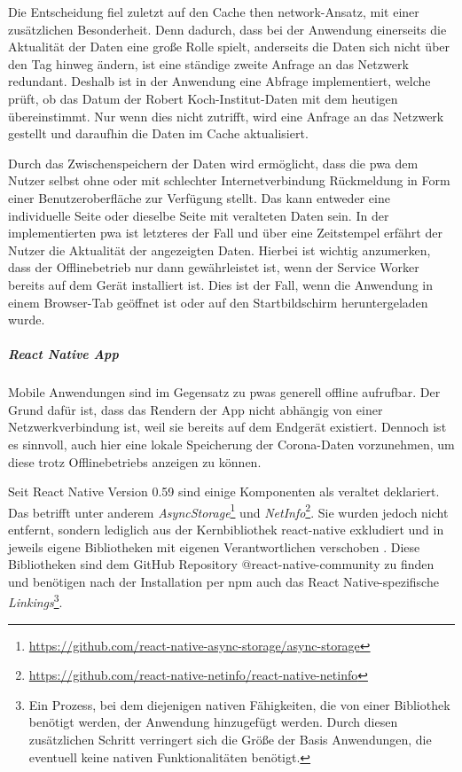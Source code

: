 Die Entscheidung fiel zuletzt auf den \glqq Cache then network\grqq{}-Ansatz, mit einer zusätzlichen Besonderheit.
Denn dadurch, dass bei der Anwendung einerseits die Aktualität der Daten eine große Rolle spielt, anderseits die Daten sich nicht über den Tag hinweg ändern, ist eine ständige zweite Anfrage an das Netzwerk redundant.
Deshalb ist in der Anwendung eine Abfrage implementiert, welche prüft, ob das Datum der Robert Koch-Institut-Daten mit dem heutigen übereinstimmt.
Nur wenn dies nicht zutrifft, wird eine Anfrage an das Netzwerk gestellt und daraufhin die Daten im Cache aktualisiert.

Durch das Zwischenspeichern der Daten wird ermöglicht, dass die \ac{pwa} dem Nutzer selbst ohne oder mit schlechter Internetverbindung Rückmeldung in Form einer Benutzeroberfläche zur Verfügung stellt.
Das kann entweder eine individuelle Seite oder dieselbe Seite mit veralteten Daten sein.
In der implementierten \ac{pwa} ist letzteres der Fall und über eine Zeitstempel erfährt der Nutzer die Aktualität der angezeigten Daten.
Hierbei ist wichtig anzumerken, dass der Offlinebetrieb nur dann gewährleistet ist, wenn der Service Worker bereits auf dem Gerät installiert ist.
Dies ist der Fall, wenn die Anwendung in einem Browser-Tab geöffnet ist oder auf den Startbildschirm heruntergeladen wurde.

\subparagraph{React Native App\\}
Mobile Anwendungen sind im Gegensatz zu \acp{pwa} generell offline aufrufbar.
Der Grund dafür ist, dass das Rendern der App nicht abhängig von einer Netzwerkverbindung ist, weil sie bereits auf dem Endgerät existiert.
Dennoch ist es sinnvoll, auch hier eine lokale Speicherung der Corona-Daten vorzunehmen, um diese trotz Offlinebetriebs anzeigen zu können.

Seit React Native Version 0.59 sind einige Komponenten als veraltet deklariert.
Das betrifft unter anderem \textit{AsyncStorage}\footnote{\url{https://github.com/react-native-async-storage/async-storage}} und \textit{NetInfo}\footnote{\url{https://github.com/react-native-netinfo/react-native-netinfo}}.
Sie wurden jedoch nicht entfernt, sondern lediglich aus der Kernbibliothek react-native exkludiert und in jeweils eigene Bibliotheken mit eigenen Verantwortlichen verschoben \cite{Turner.2019}.
Diese Bibliotheken sind dem GitHub Repository @react-native-community zu finden und benötigen nach der Installation per npm auch das React Native-spezifische \textit{Linkings}\footnote{Ein Prozess, bei dem diejenigen nativen Fähigkeiten, die von einer Bibliothek benötigt werden, der Anwendung hinzugefügt werden. Durch diesen zusätzlichen Schritt verringert sich die Größe der Basis Anwendungen, die eventuell keine nativen Funktionalitäten benötigt.}.


